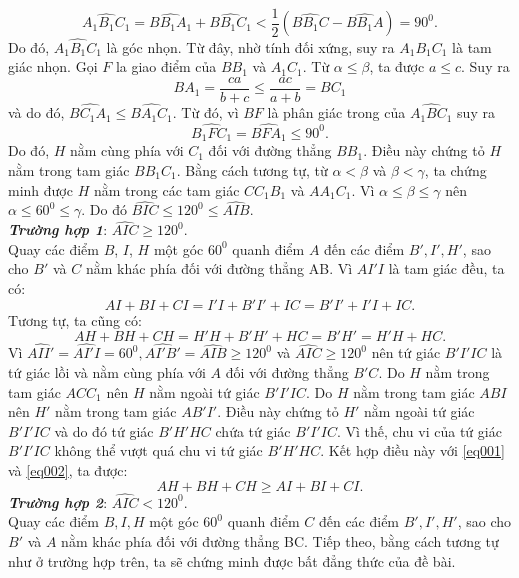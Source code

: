 \begin{bt}
{		$$ \widehat{A_1B_1C_1}=\widehat{BB_1A_1}+\widehat{BB_1C_1}< \dfrac{1}{2}(\widehat{BB_1C}-\widehat{BB_1A})=90^0.$$
		Do đó, $\widehat{A_1B_1C_1}$ là góc nhọn. Từ đây, nhờ tính đối xứng, suy ra $A_1B_1C_1$ là tam giác nhọn.
		Gọi $F$ la giao điểm của $BB_1$ và $A_1C_1.$ Từ $\alpha \leq \beta$, ta được $a\leq c$. Suy ra 
		$$ BA_1=\dfrac{ca}{b+c}\leq \dfrac{ac}{a+b}=BC_1 $$ 
		và do đó, $\widehat{BC_1A_1}\leq \widehat{BA_1C_1}.$
		Từ đó, vì $BF$ là phân giác trong của $\widehat{A_1BC_1}$ suy ra $$\widehat{B_1FC_1}=\widehat{BFA_1}\leq 90^0.$$
		Do đó, $H$ nằm cùng phía với $C_1$ đối với đường thẳng $BB_1$. Điều này chứng tỏ $H$ nằm trong tam giác $BB_1C_1.$
		Bằng cách tương tự, từ $\alpha<\beta$ và $\beta<\gamma$, ta chứng minh được $H$ nằm trong các tam giác $CC_1B_1$ và $AA_1C_1.$
		Vì $\alpha \leq \beta \leq \gamma$ nên $\alpha \leq 60^0 \leq \gamma.$ Do đó $\widehat{BIC}\leq 120^0 \leq \widehat{AIB}.$\\
		\textit{\textbf{Trường hợp 1}}: $\widehat{AIC} \geq 120^0.$\\Quay các điểm $B$, $I$, $H$ một góc $60^0$ quanh điểm $A$ đến các điểm $B', I', H'$, sao cho $B'$ và $C$ nằm khác phía đối với đường thẳng AB. Vì $AI'I$ là tam giác đều, ta có:
		\begin{equation}\label{eq001}
		AI+BI+CI=I'I+B'I'+IC=B'I'+I'I+IC. 
		\end{equation}
		Tương tự, ta cũng có:
		\begin{equation}\label{eq002}
		AH+BH+CH=H'H+B'H'+HC=B'H'=H'H+HC. 
		\end{equation}
		Vì $\widehat{AII'}=\widehat{AI'I}=60^0, \widehat{AI'B'}=\widehat{AIB}\geq 120^0$ và $\widehat{AIC}\geq 120^0$ nên tứ giác $B'I'IC$ là tứ giác lồi và nằm cùng phía với $A$ đối với đường thẳng $B'C.$
		Do $H$ nằm trong tam giác $ACC_1$ nên $H$ nằm ngoài tứ giác $B'I'IC$.
		Do $H$ nằm trong tam giác $ABI$ nên $H'$ nằm trong tam giác $AB'I'.$ Điều này chứng tỏ $H'$ nằm ngoài tứ giác $B'I'IC$ và do đó tứ giác $B'H'HC$ chứa tứ giác $B'I'IC.$ Vì thế, chu vi của tứ giác $B'I'IC$ không thể vượt quá chu vi tứ giác $B'H'HC.$ Kết hợp điều này với \eqref{eq001} và \eqref{eq002}, ta được:
		$$ AH+BH+CH \geq AI+BI+CI.$$
		\textit{\textbf{Trường hợp 2}}: $\widehat{AIC}<120^0.$\\
		Quay các điểm $B, I, H$ một góc $60^0$ quanh điểm $C$ đến các điểm $B', I', H'$, sao cho $B'$ và $A$ nằm khác phía đối với đường thẳng BC. Tiếp theo, bằng cách tương tự như ở trường hợp trên, ta sẽ chứng minh được bất đẳng thức của đề bài.
	}
\end{bt}
